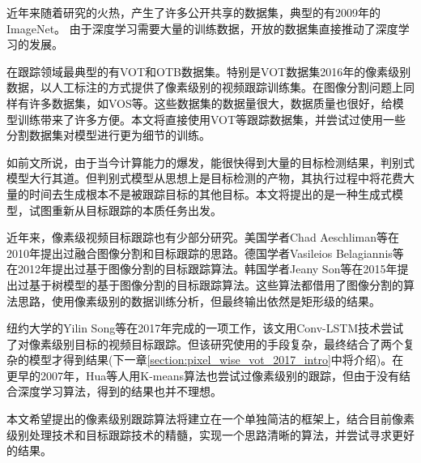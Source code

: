 \par
近年来随着研究的火热，产生了许多公开共享的数据集，典型的有2009年的ImageNet\supercite{imagenet_cvpr09}。
由于深度学习需要大量的训练数据，开放的数据集直接推动了深度学习的发展。
\par
在跟踪领域最典型的有VOT\supercite{VOT_TPAMI}和OTB\supercite{WuLimYang13}数据集。特别是VOT数据集2016年的像素级别数据\supercite{Vojir-TR-2017-01}，以人工标注的方式提供了像素级别的视频跟踪训练集。在图像分割问题上同样有许多数据集，如VOS\supercite{Cae+17}等。这些数据集的数据量很大，数据质量也很好，给模型训练带来了许多方便。本文将直接使用VOT等跟踪数据集，并尝试过使用一些分割数据集对模型进行更为细节的训练。
\par
如前文所说，由于当今计算能力的爆发，能很快得到大量的目标检测结果，判别式模型大行其道。但判别式模型从思想上是目标检测的产物，其执行过程中将花费大量的时间去生成根本不是被跟踪目标的其他目标。本文将提出的是一种生成式模型，试图重新从目标跟踪的本质任务出发。
\par
近年来，像素级视频目标跟踪也有少部分研究。美国学者Chad Aeschliman等在2010年提出过融合图像分割和目标跟踪的思路\supercite{aeschliman2010probabilistic}。德国学者Vasileios Belagiannis等在2012年提出过基于图像分割的目标跟踪算法\supercite{belagiannis2012segmentation}。韩国学者Jeany Son等在2015年提出过基于树模型的基于图像分割的目标跟踪算法\supercite{son2015tracking}。这些算法都借用了图像分割的算法思路，使用像素级别的数据训练分析，但最终输出依然是矩形级的结果。
\par
纽约大学的Yilin Song等在2017年完成的一项工作\supercite{DBLP:journals/corr/abs-1711-07377}，该文用Conv-LSTM技术\supercite{PatrauceanHC16}尝试了对像素级别目标的视频目标跟踪。但该研究使用的手段复杂，最终结合了两个复杂的模型才得到结果(下一章\ref{section:pixel_wise_vot_2017_intro}中将介绍)。在更早的2007年，Hua等人用K-means算法也尝试过像素级别的跟踪\supercite{hua2008k}，但由于没有结合深度学习算法，得到的结果也并不理想。
\par
本文希望提出的像素级别跟踪算法将建立在一个单独简洁的框架上，结合目前像素级别处理技术和目标跟踪技术的精髓，实现一个思路清晰的算法，并尝试寻求更好的结果。

